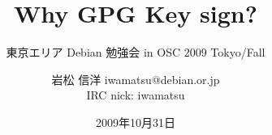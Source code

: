 




\documentclass[cjk,dvipdfmx,12pt]{beamer}
\usepackage{monthlypresentation}



\title{Why GPG Key sign?}
\subtitle{東京エリア Debian 勉強会 in OSC 2009 Tokyo/Fall}
\author{岩松 信洋 iwamatsu@debian.or.jp\\IRC nick: iwamatsu}
\date{2009年10月31日}



